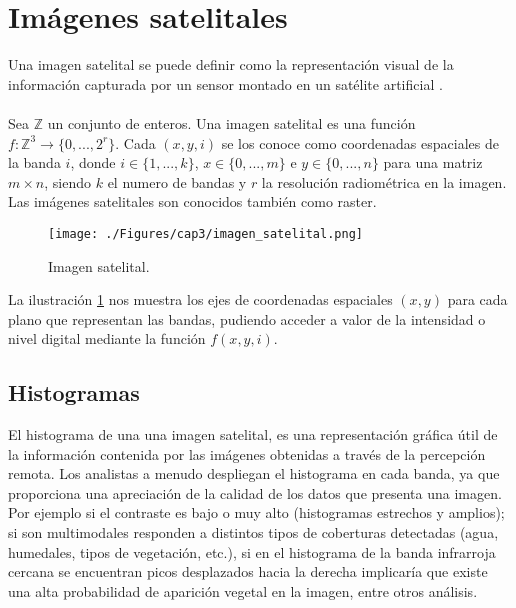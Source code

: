 \section{Im\'agenes satelitales}

Una imagen satelital se puede definir como la representaci\'on visual de la informaci\'on capturada por un sensor montado en un sat\'elite artificial \cite{acosta2003experiencia}. \\~\\
Sea $ \mathbb{Z} $ un conjunto de enteros. Una imagen satelital es una funci\'on $ f:\mathbb{Z}^{3} \longrightarrow \{0,...,2^{r}\} $. Cada $ (x,y,i) $ se los conoce como coordenadas espaciales de la banda $ i $, donde $ i \in \{1,...,k\} $, $ x \in \{0,...,m\} $ e $ y \in \{0,...,n\} $ para una matriz $ m \times n $, siendo $ k $ el numero de bandas y $ r $ la resoluci\'on radiom\'etrica en la imagen. Las im\'agenes satelitales son conocidos tambi\'en como raster.
  \begin{figure}[H]
  	\centering
  	\texttt{[image: ./Figures/cap3/imagen\_satelital.png]}
  	\caption{Imagen satelital.}
  	\label{fig:imagenMultiespectral}
  \end{figure}
La ilustraci\'on \ref{fig:imagenMultiespectral} nos muestra los ejes de coordenadas espaciales $ (x,y) $ para cada plano que representan las bandas, pudiendo acceder a valor de la intensidad o nivel digital mediante la funci\'on $ f(x,y,i) $.


\subsection{Histogramas}
El histograma de una una imagen satelital, es una representaci\'on gr\'afica \'util de la informaci\'on contenida por las im\'agenes obtenidas a trav\'es de la percepci\'on remota. Los analistas a menudo despliegan el histograma en cada banda, ya que proporciona una apreciaci\'on de la calidad de los datos que presenta una imagen. Por ejemplo si el contraste es bajo o muy alto (histogramas estrechos y amplios); si son multimodales responden a distintos tipos de coberturas detectadas (agua, humedales, tipos de vegetaci\'on, etc.), si en  el histograma de la banda infrarroja cercana se encuentran picos desplazados hacia la derecha implicar\'ia que existe una alta probabilidad de aparici\'on vegetal en la imagen, entre otros an\'alisis.

